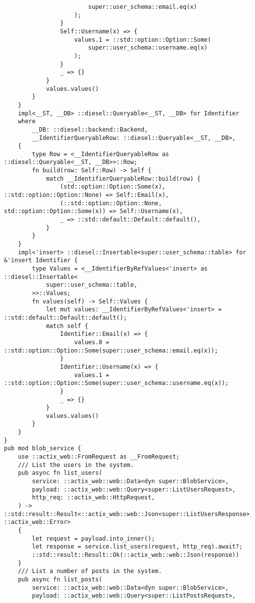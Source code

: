 \begin{verbatim}
                        super::user_schema::email.eq(x)
                    );
                }
                Self::Username(x) => {
                    values.1 = ::std::option::Option::Some(
                        super::user_schema::username.eq(x)
                    );
                }
                _ => {}
            }
            values.values()
        }
    }
    impl<__ST, __DB> ::diesel::Queryable<__ST, __DB> for Identifier
    where
        __DB: ::diesel::backend::Backend,
        __IdentifierQueryableRow: ::diesel::Queryable<__ST, __DB>,
    {
        type Row = <__IdentifierQueryableRow as ::diesel::Queryable<__ST, __DB>>::Row;
        fn build(row: Self::Row) -> Self {
            match __IdentifierQueryableRow::build(row) {
                (std::option::Option::Some(x), ::std::option::Option::None) => Self::Email(x),
                (::std::option::Option::None, std::option::Option::Some(x)) => Self::Username(x),
                _ => ::std::default::Default::default(),
            }
        }
    }
    impl<'insert> ::diesel::Insertable<super::user_schema::table> for &'insert Identifier {
        type Values = <__IdentifierByRefValues<'insert> as ::diesel::Insertable<
            super::user_schema::table,
        >>::Values;
        fn values(self) -> Self::Values {
            let mut values: __IdentifierByRefValues<'insert> = ::std::default::Default::default();
            match self {
                Identifier::Email(x) => {
                    values.0 = ::std::option::Option::Some(super::user_schema::email.eq(x));
                }
                Identifier::Username(x) => {
                    values.1 = ::std::option::Option::Some(super::user_schema::username.eq(x));
                }
                _ => {}
            }
            values.values()
        }
    }
}
pub mod blob_service {
    use ::actix_web::FromRequest as __FromRequest;
    /// List the users in the system.
    pub async fn list_users(
        service: ::actix_web::web::Data<dyn super::BlobService>,
        payload: ::actix_web::web::Query<super::ListUsersRequest>,
        http_req: ::actix_web::HttpRequest,
    ) -> ::std::result::Result<::actix_web::web::Json<super::ListUsersResponse>, ::actix_web::Error>
    {
        let request = payload.into_inner();
        let response = service.list_users(request, http_req).await?;
        ::std::result::Result::Ok(::actix_web::web::Json(response))
    }
    /// List a number of posts in the system.
    pub async fn list_posts(
        service: ::actix_web::web::Data<dyn super::BlobService>,
        payload: ::actix_web::web::Query<super::ListPostsRequest>,

\end{verbatim}
